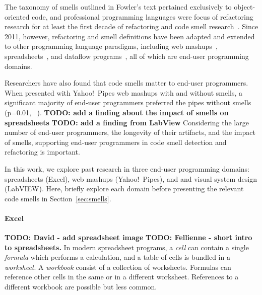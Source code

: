 \documentclass[10pt,conference,compsocconf]{IEEEtran}
\newcommand{\todo}[1]{\textbf{TODO: #1}}
\begin{document}
The taxonomy of smells outlined in Fowler's text pertained exclusively to object-oriented code, and professional programming languages were focus of refactoring research for at least the first decade of refactoring and code smell research~\cite{Mens:2004:SSR:972215.972286}.  Since 2011, however, refactoring and smell definitions have been adapted and extended to other 
programming language paradigms, including web mashups~\cite{Stolee2011, StoleeTSE2013}, spreadsheets~\cite{Hermans2011, Hermans2012inter, hermans2014bumblebee}, and dataflow programs~\cite{chambers2013smell}, all of which are  end-user programming domains. 

Researchers have also found that code smells matter to end-user programmers. When presented with Yahoo!\ Pipes web mashups with and without smells, a significant majority of end-user programmers preferred the pipes without smells (p=0.01, ~\cite{StoleeTSE2013}). \todo{add a finding about the impact of smells on spreadsheets} \todo{add a  finding from LabView}
Considering the large number of end-user programmers, the longevity of their artifacts, and the impact of smells, supporting end-user programmers in code smell detection and refactoring is important. 

In this work, we explore past research in three end-user programming domains: spreadsheets (Excel), web mashups (Yahoo!\ Pipes), and and visual system design (LabVIEW). Here, briefly explore each domain  before presenting the relevant code smells in  Section~\ref{sec:smells}.

\paragraph{Excel}
\todo{David - add spreadsheet image}
\todo{Fellienne - short intro to spreadsheets.}
In modern spreadsheet programs, a \textit{cell} can contain a single \textit{formula} which performs a calculation, and a table of cells is bundled in a \textit{worksheet}.
A \textit{workbook} consist of a collection of worksheets.
Formulas can reference other cells in the same or in a different worksheet.
References to a different workbook are possible but less common.
\end{document}
